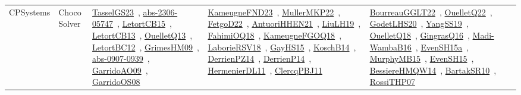 {\begin{longtable}{lp{3cm}>{\raggedright\arraybackslash}p{6cm}>{\raggedright\arraybackslash}p{6cm}>{\raggedright\arraybackslash}p{8cm}}
CPSystems & Choco Solver & \href{papers/TasselGS23.pdf}{TasselGS23}~\cite{TasselGS23}, \href{articles/abs-2306-05747.pdf}{abs-2306-05747}~\cite{abs-2306-05747}, \href{articles/LetortCB15.pdf}{LetortCB15}~\cite{LetortCB15}, \href{papers/LetortCB13.pdf}{LetortCB13}~\cite{LetortCB13}, \href{papers/OuelletQ13.pdf}{OuelletQ13}~\cite{OuelletQ13}, \href{papers/LetortBC12.pdf}{LetortBC12}~\cite{LetortBC12}, \href{papers/GrimesHM09.pdf}{GrimesHM09}~\cite{GrimesHM09}, \href{articles/abs-0907-0939.pdf}{abs-0907-0939}~\cite{abs-0907-0939}, \href{articles/GarridoAO09.pdf}{GarridoAO09}~\cite{GarridoAO09}, \href{articles/GarridoOS08.pdf}{GarridoOS08}~\cite{GarridoOS08} & \href{papers/KameugneFND23.pdf}{KameugneFND23}~\cite{KameugneFND23}, \href{articles/MullerMKP22.pdf}{MullerMKP22}~\cite{MullerMKP22}, \href{articles/FetgoD22.pdf}{FetgoD22}~\cite{FetgoD22}, \href{papers/AntuoriHHEN21.pdf}{AntuoriHHEN21}~\cite{AntuoriHHEN21}, \href{papers/LiuLH19.pdf}{LiuLH19}~\cite{LiuLH19}, \href{articles/FahimiOQ18.pdf}{FahimiOQ18}~\cite{FahimiOQ18}, \href{papers/KameugneFGOQ18.pdf}{KameugneFGOQ18}~\cite{KameugneFGOQ18}, \href{articles/LaborieRSV18.pdf}{LaborieRSV18}~\cite{LaborieRSV18}, \href{papers/GayHS15.pdf}{GayHS15}~\cite{GayHS15}, \href{papers/KoschB14.pdf}{KoschB14}~\cite{KoschB14}, \href{papers/DerrienPZ14.pdf}{DerrienPZ14}~\cite{DerrienPZ14}, \href{papers/DerrienP14.pdf}{DerrienP14}~\cite{DerrienP14}, \href{papers/HermenierDL11.pdf}{HermenierDL11}~\cite{HermenierDL11}, \href{papers/ClercqPBJ11.pdf}{ClercqPBJ11}~\cite{ClercqPBJ11} & \href{articles/BourreauGGLT22.pdf}{BourreauGGLT22}~\cite{BourreauGGLT22}, \href{papers/OuelletQ22.pdf}{OuelletQ22}~\cite{OuelletQ22}, \href{papers/GodetLHS20.pdf}{GodetLHS20}~\cite{GodetLHS20}, \href{papers/YangSS19.pdf}{YangSS19}~\cite{YangSS19}, \href{papers/OuelletQ18.pdf}{OuelletQ18}~\cite{OuelletQ18}, \href{papers/GingrasQ16.pdf}{GingrasQ16}~\cite{GingrasQ16}, \href{papers/Madi-WambaB16.pdf}{Madi-WambaB16}~\cite{Madi-WambaB16}, \href{articles/EvenSH15a.pdf}{EvenSH15a}~\cite{EvenSH15a}, \href{papers/MurphyMB15.pdf}{MurphyMB15}~\cite{MurphyMB15}, \href{papers/EvenSH15.pdf}{EvenSH15}~\cite{EvenSH15}, \href{papers/BessiereHMQW14.pdf}{BessiereHMQW14}~\cite{BessiereHMQW14}, \href{articles/BartakSR10.pdf}{BartakSR10}~\cite{BartakSR10}, \href{papers/RossiTHP07.pdf}{RossiTHP07}~\cite{RossiTHP07}\\

\end{longtable}}
